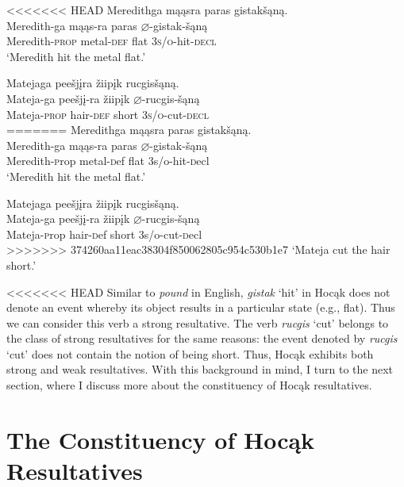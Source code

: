 \documentclass[output=paper]{LSP/langsci}
\begin{document}
\begin{exe}
\begin{exe}
\begin{exe}
\begin{xlist}
<<<<<<< HEAD
\ex \glll Meredithga mąąsra paras gistakšąną. \\
 Meredith-ga mąąs-ra paras {$\varnothing$}-gistak-šąną\\
Meredith-\textsc{prop} metal-\textsc{def} flat \textsc{3s/o}-hit-\textsc{decl}\\
\glt `Meredith hit the metal flat.'

\ex \glll Matejaga peešjįra žiipįk rucgisšąną.\\
Mateja-ga peešjį-ra žiipįk {$\varnothing$}-rucgis-šąną\\
Mateja-\textsc{prop} hair-\textsc{def} short \textsc{3s/o}-cut-\textsc{decl}\\
=======
\ex \glll Meredithga m\k{a}\k{a}sra paras gistak\v{s}\k{a}n\k{a}. \\
 Meredith-ga m\k{a}\k{a}s-ra paras $\varnothing$-gistak-\v{s}\k{a}n\k{a}\\
Meredith-{\textsc prop} metal-{\textsc def} flat {\textsc 3s/o}-hit-{\textsc decl}\\
\glt `Meredith hit the metal flat.'

\ex \glll Matejaga pee\v{s}j\k{i}ra \v{z}iip\k{i}k rucgis\v{s}\k{a}n\k{a}.\\
Mateja-ga pee\v{s}j\k{i}-ra \v{z}iip\k{i}k $\varnothing$-rucgis-\v{s}\k{a}n\k{a}\\
Mateja-{\textsc prop} hair-{\textsc def} short {\textsc 3s/o}-cut-{\textsc decl}\\
>>>>>>> 374260aa11eac38304f850062805c954c530b1e7
\glt `Mateja cut the hair short.'

\end{xlist}
\end{exe}

<<<<<<< HEAD
Similar to \textit{pound} in English, \textit{gistak} `hit' in Hocąk does not denote an event whereby its object results in a particular state (e.g., flat). Thus we can consider this verb a strong resultative. The verb \textit{rucgis} `cut' belongs to the class of strong resultatives for the same reasons: the event denoted by \textit{rucgis} `cut' does not contain the notion of being short. Thus, Hocąk exhibits both strong and weak resultatives. With this background in mind, I turn to the next section, where I discuss more about the constituency of Hocąk resultatives.

\section{The Constituency of Hocąk Resultatives}


\end{exe}
\end{exe}
\end{document}

